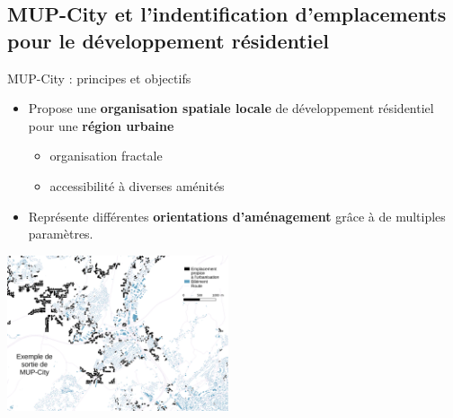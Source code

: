 \documentclass[xcolor=table]{beamer}
\begin{document}
\subsection[MUP-City]{MUP-City et l'indentification d'emplacements pour le développement résidentiel}
\begin{frame}
\subsectionpage
\end{frame}


\begin{frame}{MUP-City : principes et objectifs}
	\\
	\begin{itemize}
		\item Propose une \textbf{organisation spatiale locale} de développement résidentiel pour une \textbf{région urbaine}
		\begin{itemize}
			\item<2-> organisation fractale
			\item<3-> accessibilité à diverses aménités %
		\end{itemize}
		\item<4> Représente différentes \textbf{orientations d'aménagement} grâce à de multiples paramètres.
	\end{itemize}
	\includegraphics[width=6.5cm]{Images/ex-sorties-mup.png}
\end{frame}
\end{document}
